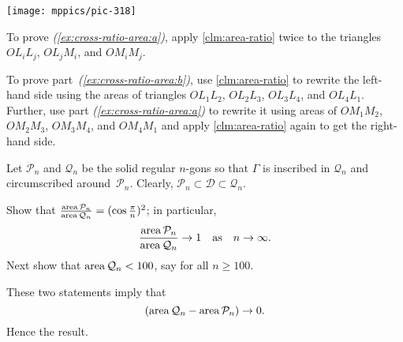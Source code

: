 \begin{multicols}{2}
\begin{Figure}
\vskip0mm
\centering
\texttt{[image: mppics/pic-318]}
\end{Figure}

To prove \textit{(\ref{ex:cross-ratio-area:a})}, apply \ref{clm:area-ratio} twice to the triangles $OL_iL_j$, $OL_jM_i$, and $OM_iM_j$.

To prove part~\textit{(\ref{ex:cross-ratio-area:b})}, use \ref{clm:area-ratio} to rewrite the left-hand side using the areas of triangles $OL_1L_2$, $OL_2L_3$, $OL_3L_4$, and $OL_4L_1$.
Further, use part \textit{(\ref{ex:cross-ratio-area:a})} to rewrite it using areas of $OM_1M_2$, $OM_2M_3$, $OM_3M_4$, and $OM_4M_1$ and apply \ref{clm:area-ratio} again to get the right-hand side.


Let $\mathcal{P}_n$ and $\mathcal{Q}_n$ be the solid regular $n$-gons
so that $\Gamma$ is inscribed in $\mathcal{Q}_n$ and circumscribed around~$\mathcal{P}_n$.
Clearly,
$\mathcal{P}_n\subset\mathcal{D}\subset\mathcal{Q}_n$.

Show that 
$\tfrac{\mathop{\rm area}\nolimits\mathcal{P}_n}{\mathop{\rm area}\nolimits\mathcal{Q}_n}=(\cos\tfrac\pi n)^2$;
in particular, 
$$\frac{\mathop{\rm area}\nolimits\mathcal{P}_n}{\mathop{\rm area}\nolimits\mathcal{Q}_n}\to 1
\quad
\text{as}
\quad
n\to\infty.$$
Next show that $\mathop{\rm area}\nolimits\mathcal{Q}_n<100$, say for all $n\ge 100$.

These two statements imply that
\[(\area\mathcal{Q}_n\z-\area\mathcal{P}_n)\to 0.\]
Hence the result.

\end{multicols}

\newpage
